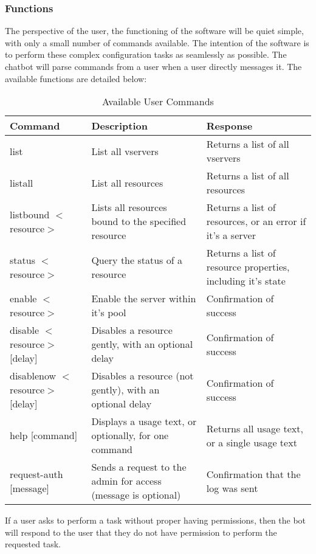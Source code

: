 \subsubsection{Functions}
The perspective of the user, the functioning of the software will be quiet simple, with only a small number of commands available.
The intention of the software is to perform these complex configuration tasks as seamlessly as possible.
The chatbot will parse commands from a user when a user directly messages it.
The available functions are detailed below:
\begin{longtable}[h]{ | p{1.85in} | p{2.7in} | p{1.95in} |  }
     \caption{Available User Commands}
     \\\hline
     \textbf{Command} & \textbf{Description} & \textbf{Response} \\
     \hline
     list
     & List all vservers
     & Returns a list of all vservers\\
     \hline
     listall
     & List all resources
     & Returns a list of all resources\\
     \hline
     listbound $<$resource$>$
     & Lists all resources bound to the specified resource
     & Returns a list of resources, or an error if it's a server \\
     \hline
     status $<$resource$>$
     & Query the status of a resource
     & Returns a list of resource properties, including it's state \\
     \hline
     enable $<$resource$>$
     & Enable the server within it's pool
     & Confirmation of success \\
     \hline
     disable $<$resource$>$ [delay]
     & Disables a resource gently, with an optional delay
     & Confirmation of success \\
     \hline
     disablenow $<$resource$>$ [delay]
     & Disables a resource (not gently), with an optional delay
     & Confirmation of success \\
     \hline
     help [command]
     & Displays a usage text, or optionally, for one command
     & Returns all usage text, or a single usage text \\
     \hline
     request-auth [message]
     & Sends a request to the admin for access (message is optional)
     & Confirmation that the log was sent \\
     \hline
\end{longtable}

If a user asks to perform a task without proper having permissions, then the bot will respond to the user that they do not have permission to perform the requested task.

